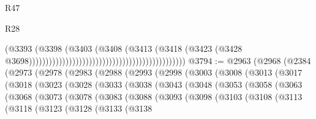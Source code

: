 \begin{lexlean}{R47}
\begin{lexlean}{R28}
\begin{coremodule}
{{{{{{{{{{{{{{{{{{{{{{{{{{{{{{{{{{{{{{{{{{{{{{{{{{{{{{{{{{{{{{{{{{{{{{{{{{{{{{{{{{{{{{{{{{{{{{{{{{{{{{{{{{{{{{{{{{{{{{{{{{{{{{{{{{{{{                                                                                  (@3393
                                                                                    (@3398
                                                                                      (@3403
                                                                                        (@3408
                                                                                          (@3413
                                                                                            (@3418
                                                                                              (@3423
                                                                                                (@3428
                                                                                                  @3698)))))))))))))))))))))))))))))))))))))))))))))))
@3794 := @2963
    (@2968
      (@2384
        (@2973
          (@2978
            (@2983
              (@2988
                (@2993
                  (@2998
                    (@3003
                      (@3008
                        (@3013
                          (@3017
                            (@3018
                              (@3023
                                (@3028
                                  (@3033
                                    (@3038
                                      (@3043
                                        (@3048
                                          (@3053
                                            (@3058
                                              (@3063
                                                (@3068
                                                  (@3073
                                                    (@3078
                                                      (@3083
                                                        (@3088
                                                          (@3093
                                                            (@3098
                                                              (@3103
                                                                (@3108
                                                                  (@3113
                                                                    (@3118
                                                                      (@3123
                                                                        (@3128
                                                                          (@3133
                                                                            (@3138
}}}}}}}}}}}}}}}}}}}}}}}}}}}}}}}}}}}}}}}}}}}}}}}}}}}}}}}}}}}}}}}}}}}}}}}}}}}}}}}}}}}}}}}}}}}}}}}}}}}}}}}}}}}}}}}}}}}}}}}}}}}}}}}}}}}}}
\end{coremodule}
\end{lexlean}
\end{lexlean}
